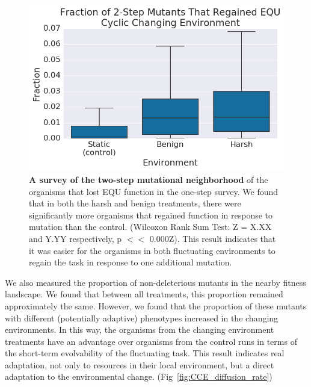 \documentclass[PhD]{msu-thesis}
\begin{document}
	\begin{figure}[!h] %
	\includegraphics[trim={0.2cm 0 0.4cm 0.25cm},clip,width=0.75\columnwidth]{figures/CE/CCE_frac_2step__box.png}

	\caption{\textbf{A survey of the two-step mutational neighborhood} of the organisms that lost EQU function in the one-step survey. We found that in both the harsh and benign treatments, there were significantly more organisms that regained function in response to mutation than the control. (Wilcoxon Rank Sum Test: Z = X.XX and Y.YY respectively, p $<<$ 0.000Z). This result indicates that it was easier for the organisms in both fluctuating environments to regain the task in response to one additional mutation.
	}\label{fig:CCE_two_step}
	\end{figure}

We also measured the proportion of non-deleterious mutants in the nearby fitness landscape. We found that between all treatments, this proportion
remained approximately the same. However, we found that the proportion of these mutants with different (potentially adaptive) phenotypes increased in the changing environments. In this way, the organisms from the changing environment treatments have an advantage over organisms from the control runs in terms of the short-term evolvability of the fluctuating task. This result indicates real adaptation, not only to resources in their local environment, but a direct adaptation to the environmental change. (Fig~\ref{fig:CCE_diffusion_rate})
\end{document}
